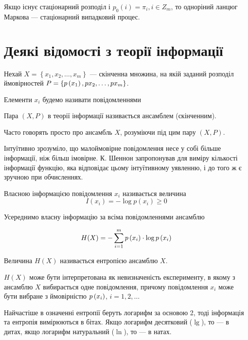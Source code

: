 Якщо існує стаціонарний розподіл  і $p_0\left( i \right) = \pi_i, i \in Z_m$,
то одноріний ланцюг Маркова --- стаціонарний випадковий процес.

\section{Деякі відомості з теорії інформації}

Нехай  $X=\left\{ x_1, x_2, \dots, x_m \right\}$ ---
скінченна множина, на якій заданий розподіл ймовірностей 
$P = \left\{ p\left(x_1\right), p{x_2}, \dots, p{x_m} \right\}$.

\begin{definition}[Повідомлення]
    Елементи  $x_i$ будемо називати повідомленнями
\end{definition}

\begin{definition}
    Пара $\left( X, P \right)$ в теорії інформації
    називається ансамблем (скінченним).
\end{definition}

Часто говорять просто про ансамбль $X$, розуміючи під цим пару
$\left( X, P \right)$.

Інтуїтивно зрозуміло, що малоймовірне повідомлення несе у собі  більше
інформації, ніж більш імовірне. К. Шеннон запропонував для виміру кількості
інформації функцію, яка відповідає цьому інтуїтивному уявленню, і до того ж  є
зручною при обчисленнях.

\begin{definition}
    Власною інформацією повідомлення $x_i$ називається величина
    $$I\left(x_i\right)=-\log{p\left( x_i \right)} \ge 0$$
\end{definition}

Усереднимо власну інформацію за всіма повідомленнями ансамблю

$$H(X)=-\sum_{i=1}^m p\left(x_i\right) \cdot \log{p\left(x_i\right)}$$

\begin{definition}
Величина  $H\left( X \right)$ називається ентропією ансамблю $X$.
\end{definition}

$H\left( X \right)$ може бути інтерпретована як невизначеність експерименту,
в  якому  з ансамблю $X$ вибирається одне повідомлення, причому
повідомлення $x_i$ може бути вибране з ймовірністю $p\left(x_i\right)$, $i=1,2,\dots$

Найчастіше в означенні ентропії
беруть логарифм за основою 2, тоді інформація та ентропія вимірюються в бітах.
Якщо логарифм десятковий ($\lg$), то --- в дитах,
якщо логарифм натуральний ($\ln$), то --- в натах.

